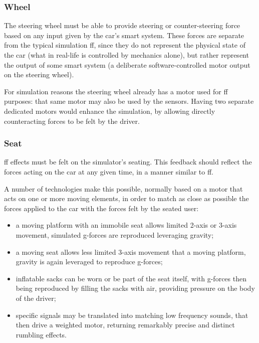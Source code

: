 \subsubsection{Wheel}

The steering wheel must be able to provide steering or counter-steering force based on any input given by the car's smart system. These forces are separate from the typical simulation \gls{ff}, since they do not represent the physical state of the car (what in real-life is controlled by mechanics alone), but rather represent the output of some smart system (a deliberate software-controlled motor output on the steering wheel).

For simulation reasons the steering wheel already has a motor used for \gls{ff} purposes: that same motor may also be used by the sensors. Having two separate dedicated motors would enhance the simulation, by allowing directly counteracting forces to be felt by the driver.

\subsubsection{Seat}

\gls{ff} effects must be felt on the simulator's seating. This feedback should reflect the forces acting on the car at any given time, in a manner similar to \gls{ff}.

A number of technologies make this possible, normally based on a motor that acts on one or more moving elements, in order to match as close as possible the forces applied to the car with the forces felt by the seated user:

\begin{itemize}
	\item a moving platform with an immobile seat allows limited 2-axis or 3-axis movement, simulated g-forces are reproduced leveraging gravity;
    \item a moving seat allows less limited 3-axis movement that a moving platform, gravity is again leveraged to reproduce g-forces;
	\item inflatable sacks can be worn or be part of the seat itself, with g-forces then being reproduced by filling the sacks with air, providing pressure on the body of the driver;~\cite{feasibility:gametrix}
	\item specific signals may be translated into matching low frequency sounds, that then drive a weighted motor, returning remarkably precise and distinct rumbling effects.~\cite{feasibility:buttkicker}
\end{itemize}

